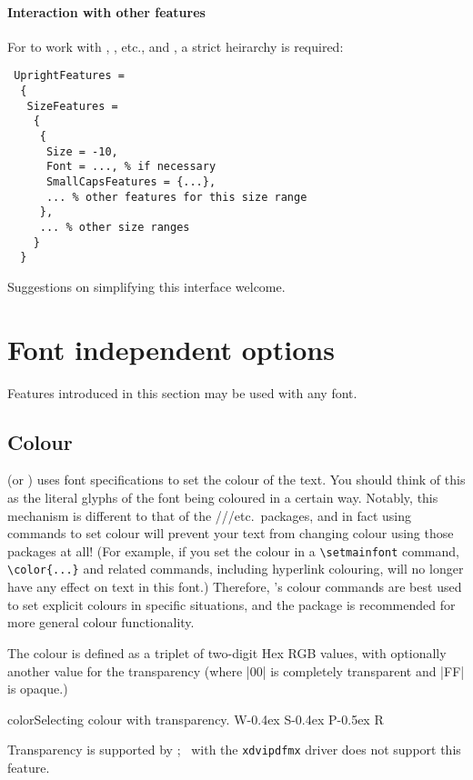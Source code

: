 \documentclass[a4paper]{l3doc}
\begin{document}
\paragraph{Interaction with other features}
For  to work with , , etc., and , a strict heirarchy is required:
\begin{Verbatim}
 UprightFeatures =
  {
   SizeFeatures =
    {
     {
      Size = -10,
      Font = ..., % if necessary
      SmallCapsFeatures = {...},
      ... % other features for this size range
     },
     ... % other size ranges
    }
  }
\end{Verbatim}
Suggestions on simplifying this interface welcome.


\section{Font independent options}
\label{sec:font-ind-features}

Features introduced in this section may be used with any font.

\subsection{Colour}

 (or ) uses font specifications to set the colour of
the text.
You should think of this as the literal glyphs of the font being coloured in a certain way.
Notably, this mechanism is different to that of the ///etc.\ packages, and in fact using  commands to set colour will prevent your text from changing colour using those packages at all!
(For example, if you set the colour in a \verb|\setmainfont| command, \verb|\color{...}| and related commands, including hyperlink colouring, will no longer have any effect on text in this font.)
Therefore, 's colour commands are best used to set explicit colours in specific situations, and the  package is recommended for more general colour functionality.

The colour is defined as a triplet of two-digit Hex RGB
values, with optionally another value for the transparency (where
|00| is completely transparent and |FF| is opaque.)
\begin{Lexample}{color}{Selecting colour with transparency.}
  \fontsize{48}{48}
  {W}\kern-0.4ex
  {S}\kern-0.4ex
  {P}\kern-0.5ex
  {R}
\end{Lexample}
Transparency is supported by \LuaLaTeX; \XeLaTeX\ with the \texttt{xdvipdfmx} driver
does not support this feature.
\end{document}
